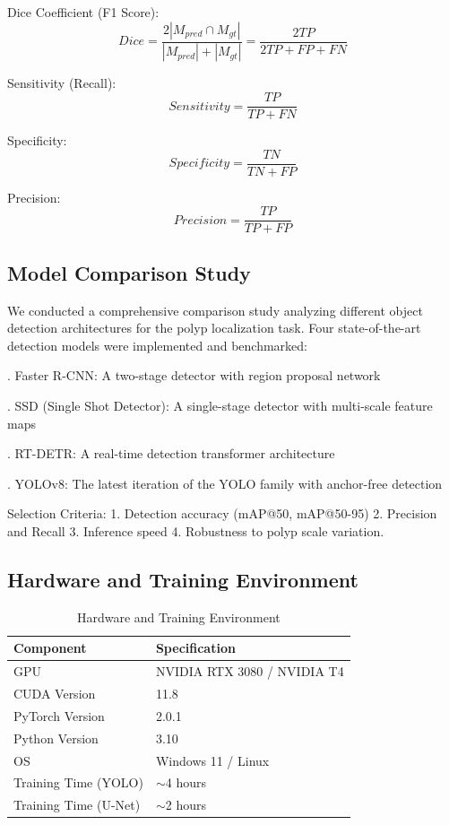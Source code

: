 \documentclass[runningheads]{llncs}
\begin{document}
\noindent Dice Coefficient (F1 Score):
\begin{equation}
Dice=\frac{2|M_{pred} \cap M_{gt}|}{|M_{pred}|+|M_{gt}|}=\frac{2TP}{2TP+FP+FN}
\end{equation}

\noindent Sensitivity (Recall):
\begin{equation}
Sensitivity=\frac{TP}{TP+FN}
\end{equation}

\noindent Specificity:
\begin{equation}
Specificity=\frac{TN}{TN+FP}
\end{equation}

\noindent Precision:
\begin{equation}
Precision=\frac{TP}{TP+FP}
\end{equation}

\subsection{Model Comparison Study}
We conducted a comprehensive comparison study analyzing different object detection architectures for the polyp localization task. Four state-of-the-art detection models were implemented and benchmarked:

. Faster R-CNN: A two-stage detector with region proposal network

. SSD (Single Shot Detector): A single-stage detector with multi-scale feature maps

. RT-DETR: A real-time detection transformer architecture

. YOLOv8: The latest iteration of the YOLO family with anchor-free detection

Selection Criteria: 1. Detection accuracy (mAP@50, mAP@50-95) 2. Precision and Recall 3. Inference speed 4. Robustness to polyp scale variation.

\subsection{Hardware and Training Environment}

\begin{table}[H]
\caption{Hardware and Training Environment}
\label{tab:hardware}
\centering
\begin{tabular}{ll}
\toprule
\textbf{Component} & \textbf{Specification} \\
\midrule
GPU & NVIDIA RTX 3080 / NVIDIA T4 \\
CUDA Version & 11.8 \\
PyTorch Version & 2.0.1 \\
Python Version & 3.10 \\
OS & Windows 11 / Linux \\
Training Time (YOLO) & $\sim$4 hours \\
Training Time (U-Net) & $\sim$2 hours \\
\bottomrule
\end{tabular}
\end{table}
\end{document}
